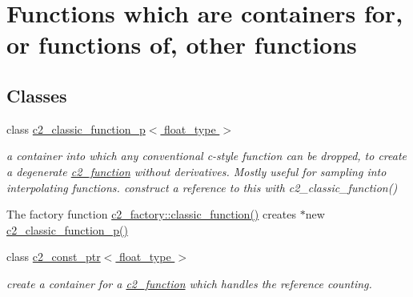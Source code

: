 \hypertarget{group__containers}{\section{Functions which are containers for, or functions of, other functions}
\label{group__containers}
}
\subsection*{Classes}
\begin{DoxyCompactItemize}
\item 
class \hyperlink{classc2__classic__function__p}{c2\-\_\-classic\-\_\-function\-\_\-p$<$ float\-\_\-type $>$}
\begin{DoxyCompactList}\small\item\em a container into which any conventional c-\/style function can be dropped, to create a degenerate \hyperlink{classc2__function}{c2\-\_\-function} without derivatives. Mostly useful for sampling into interpolating functions. construct a reference to this with c2\-\_\-classic\-\_\-function()

The factory function \hyperlink{classc2__factory_ae5c9140b2bfcc6416682562b99479974}{c2\-\_\-factory\-::classic\-\_\-function()} creates $\ast$new \hyperlink{classc2__classic__function__p_a8b2d09d67a8835902fd6c684d5b183b7}{c2\-\_\-classic\-\_\-function\-\_\-p()} \end{DoxyCompactList}\item 
class \hyperlink{classc2__const__ptr}{c2\-\_\-const\-\_\-ptr$<$ float\-\_\-type $>$}
\begin{DoxyCompactList}\small\item\em create a container for a \hyperlink{classc2__function}{c2\-\_\-function} which handles the reference counting.


\end{DoxyCompactList}
\end{DoxyCompactItemize}

